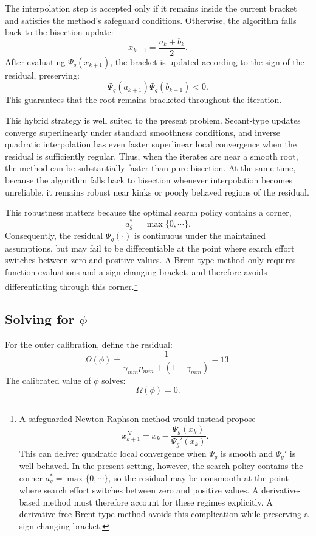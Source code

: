 \documentclass{article}
\begin{document}
The interpolation step is accepted only if it remains inside the current bracket and satisfies the method's safeguard conditions. Otherwise, the algorithm falls back to the bisection update:
\[
x_{k+1}
=
\frac{a_k+b_k}{2}.
\]
After evaluating $\Psi_g(x_{k+1})$, the bracket is updated according to the sign of the residual, preserving:
\[
\Psi_g(a_{k+1})\Psi_g(b_{k+1})<0.
\]
This guarantees that the root remains bracketed throughout the iteration.

This hybrid strategy is well suited to the present problem. Secant-type updates converge superlinearly under standard smoothness conditions, and inverse quadratic interpolation has even faster superlinear local convergence when the residual is sufficiently regular. Thus, when the iterates are near a smooth root, the method can be substantially faster than pure bisection. At the same time, because the algorithm falls back to bisection whenever interpolation becomes unreliable, it remains robust near kinks or poorly behaved regions of the residual.

This robustness matters because the optimal search policy contains a corner,
\[
a_g^*=\max\{0,\cdots\}.
\]
Consequently, the residual $\Psi_g(\cdot)$ is continuous under the maintained assumptions, but may fail to be differentiable at the point where search effort switches between zero and positive values. A Brent-type method only requires function evaluations and a sign-changing bracket, and therefore avoids differentiating through this corner.\footnote{A safeguarded Newton-Raphson method would instead propose
\[
x_{k+1}^{N}
=
x_k-\frac{\Psi_g(x_k)}{\Psi_g'(x_k)}.
\]
This can deliver quadratic local convergence when $\Psi_g$ is smooth and $\Psi_g'$ is well behaved. In the present setting, however, the search policy contains the corner $a_g^*=\max\{0,\cdots\}$, so the residual may be nonsmooth at the point where search effort switches between zero and positive values. A derivative-based method must therefore account for these regimes explicitly. A derivative-free Brent-type method avoids this complication while preserving a sign-changing bracket.}

\subsection{\texorpdfstring{Solving for $\phi$}{Solving for phi}}
\label{app:calibration_phi}

For the outer calibration, define the residual:
\[
\Omega(\phi)
\doteq
\frac{1}{\gamma_{mm}p_{mm}+(1-\gamma_{mm})}
-13.
\]
The calibrated value of $\phi$ solves:
\[
\Omega(\phi)=0.
\]
\end{document}

